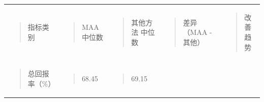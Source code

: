 \documentclass[UTF8]{ctexart}
\newcounter{none} %
\begin{document}
{\def\LTcaptype{none} %
\begin{longtable}[]{@{}
  >{\raggedright\arraybackslash}p{}
  >{\raggedright\arraybackslash}p{}
  >{\raggedright\arraybackslash}p{}
  >{\raggedright\arraybackslash}p{}
  >{\raggedright\arraybackslash}p{}@{}}
\toprule\noalign{}
\endhead
\bottomrule\noalign{}
\endlastfoot
\begin{minipage}[t]{\linewidth}\raggedright
\begin{quote}
指标类别
\end{quote}
\end{minipage} & \begin{minipage}[t]{\linewidth}\raggedright
\begin{quote}
MAA中位数
\end{quote}
\end{minipage} & \begin{minipage}[t]{\linewidth}\raggedright
\begin{quote}
其他方法 中位数
\end{quote}
\end{minipage} & \begin{minipage}[t]{\linewidth}\raggedright
\begin{quote}
差异（MAA - 其他）
\end{quote}
\end{minipage} & \begin{minipage}[t]{\linewidth}\raggedright
\begin{quote}
改善趋势
\end{quote}
\end{minipage} \\
\begin{minipage}[t]{\linewidth}\raggedright
\begin{quote}
总回报率（\%）
\end{quote}
\end{minipage} & \begin{minipage}[t]{\linewidth}\raggedright
\begin{quote}
68.45
\end{quote}
\end{minipage} & \begin{minipage}[t]{\linewidth}\raggedright
\begin{quote}
69.15
\end{quote}

\end{minipage}
\end{longtable}}
\end{document}
